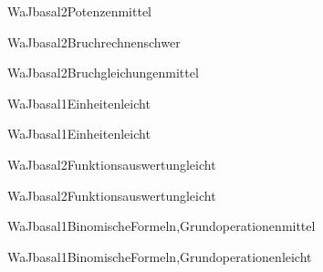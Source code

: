 \documentclass[12pt]{article}
\begin{document}
\begin{Add}{WaJ}{basal2}{Potenzen}{mittel}
\end{Add}

\begin{Add}{WaJ}{basal2}{Bruchrechnen}{schwer}
\end{Add}

\begin{Add}{WaJ}{basal2}{Bruchgleichungen}{mittel}
\end{Add}

\begin{Add}{WaJ}{basal1}{Einheiten}{leicht}
\end{Add}

\begin{Add}{WaJ}{basal1}{Einheiten}{leicht}
\end{Add}

\begin{Add}{WaJ}{basal2}{Funktionsauswertung}{leicht}
\end{Add}

\begin{Add}{WaJ}{basal2}{Funktionsauswertung}{leicht}
\end{Add}

\begin{Add}{WaJ}{basal1}{BinomischeFormeln,Grundoperationen}{mittel}
\end{Add}

\begin{Add}{WaJ}{basal1}{BinomischeFormeln,Grundoperationen}{leicht}
\end{Add}
\end{document}
